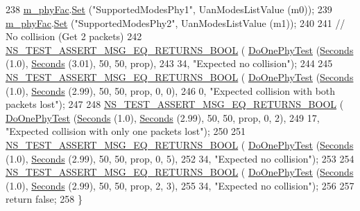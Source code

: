 \begin{DoxyCode}
238   \hyperlink{classUanTest_aa3af462909130b54c4b43b5bca42446b}{m\_phyFac}.\hyperlink{classns3_1_1ObjectFactory_aef5c0d5019c96bdf01cefd1ff83f4a68}{Set} (\textcolor{stringliteral}{"SupportedModesPhy1"}, UanModesListValue (m0));
239   \hyperlink{classUanTest_aa3af462909130b54c4b43b5bca42446b}{m\_phyFac}.\hyperlink{classns3_1_1ObjectFactory_aef5c0d5019c96bdf01cefd1ff83f4a68}{Set} (\textcolor{stringliteral}{"SupportedModesPhy2"}, UanModesListValue (m1));
240 
241   \textcolor{comment}{// No collision (Get 2 packets)}
242   \hyperlink{group__testing_ga5649dddde97a42ddfd4cd88aa53b37c6}{NS\_TEST\_ASSERT\_MSG\_EQ\_RETURNS\_BOOL} (
      \hyperlink{classUanTest_a006331b086a052683abed216dc67dd8d}{DoOnePhyTest} (\hyperlink{group__timecivil_ga33c34b816f8ff6628e33d5c8e9713b9e}{Seconds} (1.0), \hyperlink{group__timecivil_ga33c34b816f8ff6628e33d5c8e9713b9e}{Seconds} (3.01), 50, 50, prop),
243                                       34, \textcolor{stringliteral}{"Expected no collision"});
244 
245   \hyperlink{group__testing_ga5649dddde97a42ddfd4cd88aa53b37c6}{NS\_TEST\_ASSERT\_MSG\_EQ\_RETURNS\_BOOL} (
      \hyperlink{classUanTest_a006331b086a052683abed216dc67dd8d}{DoOnePhyTest} (\hyperlink{group__timecivil_ga33c34b816f8ff6628e33d5c8e9713b9e}{Seconds} (1.0), \hyperlink{group__timecivil_ga33c34b816f8ff6628e33d5c8e9713b9e}{Seconds} (2.99), 50, 50, prop, 0, 0),
246                                       0, \textcolor{stringliteral}{"Expected collision with both packets lost"});
247 
248   \hyperlink{group__testing_ga5649dddde97a42ddfd4cd88aa53b37c6}{NS\_TEST\_ASSERT\_MSG\_EQ\_RETURNS\_BOOL} (
      \hyperlink{classUanTest_a006331b086a052683abed216dc67dd8d}{DoOnePhyTest} (\hyperlink{group__timecivil_ga33c34b816f8ff6628e33d5c8e9713b9e}{Seconds} (1.0), \hyperlink{group__timecivil_ga33c34b816f8ff6628e33d5c8e9713b9e}{Seconds} (2.99), 50, 50, prop, 0, 2),
249                                       17, \textcolor{stringliteral}{"Expected collision with only one packets lost"});
250 
251   \hyperlink{group__testing_ga5649dddde97a42ddfd4cd88aa53b37c6}{NS\_TEST\_ASSERT\_MSG\_EQ\_RETURNS\_BOOL} (
      \hyperlink{classUanTest_a006331b086a052683abed216dc67dd8d}{DoOnePhyTest} (\hyperlink{group__timecivil_ga33c34b816f8ff6628e33d5c8e9713b9e}{Seconds} (1.0), \hyperlink{group__timecivil_ga33c34b816f8ff6628e33d5c8e9713b9e}{Seconds} (2.99), 50, 50, prop, 0, 5),
252                                       34, \textcolor{stringliteral}{"Expected no collision"});
253 
254   \hyperlink{group__testing_ga5649dddde97a42ddfd4cd88aa53b37c6}{NS\_TEST\_ASSERT\_MSG\_EQ\_RETURNS\_BOOL} (
      \hyperlink{classUanTest_a006331b086a052683abed216dc67dd8d}{DoOnePhyTest} (\hyperlink{group__timecivil_ga33c34b816f8ff6628e33d5c8e9713b9e}{Seconds} (1.0), \hyperlink{group__timecivil_ga33c34b816f8ff6628e33d5c8e9713b9e}{Seconds} (2.99), 50, 50, prop, 2, 3),
255                                       34, \textcolor{stringliteral}{"Expected no collision"});
256 
257   \textcolor{keywordflow}{return} \textcolor{keyword}{false};
258 \}
\end{DoxyCode}


